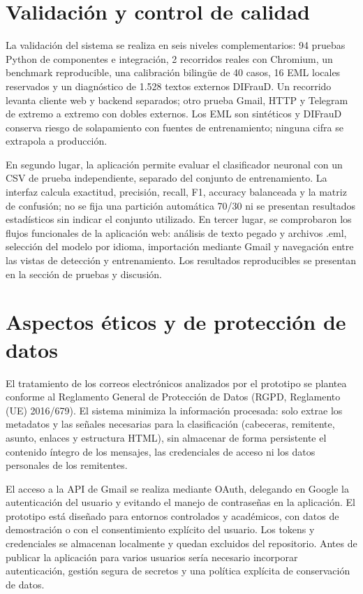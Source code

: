 \documentclass[11pt,a4paper,oneside]{report}
\begin{document}
\section{Validación y control de calidad}

La validación del sistema se realiza en seis niveles complementarios: 94 pruebas Python de componentes e integración, 2 recorridos reales con Chromium, un benchmark reproducible, una calibración bilingüe de 40 casos, 16 EML locales reservados y un diagnóstico de 1.528 textos externos DIFrauD. Un recorrido levanta cliente web y backend separados; otro prueba Gmail, HTTP y Telegram de extremo a extremo con dobles externos. Los EML son sintéticos y DIFrauD conserva riesgo de solapamiento con fuentes de entrenamiento; ninguna cifra se extrapola a producción.

En segundo lugar, la aplicación permite evaluar el clasificador neuronal con un CSV de prueba independiente, separado del conjunto de entrenamiento. La interfaz calcula exactitud, precisión, recall, F1, accuracy balanceada y la matriz de confusión; no se fija una partición automática 70/30 ni se presentan resultados estadísticos sin indicar el conjunto utilizado. En tercer lugar, se comprobaron los flujos funcionales de la aplicación web: análisis de texto pegado y archivos .eml, selección del modelo por idioma, importación mediante Gmail y navegación entre las vistas de detección y entrenamiento. Los resultados reproducibles se presentan en la sección de pruebas y discusión.

\section{Aspectos éticos y de protección de datos}

El tratamiento de los correos electrónicos analizados por el prototipo se plantea conforme al Reglamento General de Protección de Datos (RGPD, Reglamento (UE) 2016/679). El sistema minimiza la información procesada: solo extrae los metadatos y las señales necesarias para la clasificación (cabeceras, remitente, asunto, enlaces y estructura HTML), sin almacenar de forma persistente el contenido íntegro de los mensajes, las credenciales de acceso ni los datos personales de los remitentes.

El acceso a la API de Gmail se realiza mediante OAuth, delegando en Google la autenticación del usuario y evitando el manejo de contraseñas en la aplicación. El prototipo está diseñado para entornos controlados y académicos, con datos de demostración o con el consentimiento explícito del usuario. Los tokens y credenciales se almacenan localmente y quedan excluidos del repositorio. Antes de publicar la aplicación para varios usuarios sería necesario incorporar autenticación, gestión segura de secretos y una política explícita de conservación de datos.
\end{document}

